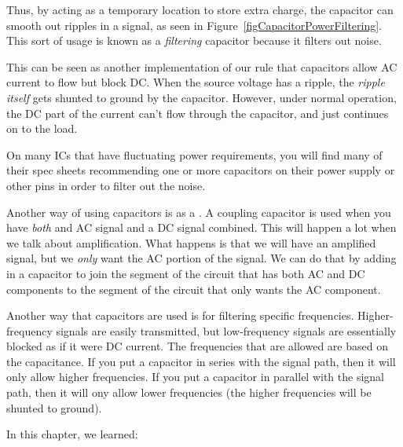 Thus, by acting as a temporary location to store extra charge, the capacitor can smooth out ripples in a signal, as seen in Figure~\ref{figCapacitorPowerFiltering}.
This sort of usage is known as a \emph{filtering} capacitor because it filters out noise.


This can be seen as another implementation of our rule that capacitors allow AC current to flow but block DC.
When the source voltage has a ripple, the \emph{ripple itself} gets shunted to ground by the capacitor.
However, under normal operation, the DC part of the current can't flow through the capacitor, and just continues on to the load.

On many ICs that have fluctuating power requirements, you will find many of their spec sheets recommending one or more capacitors on their power supply or other pins in order to filter out the noise.

Another way of using capacitors is as a .
A coupling capacitor is used when you have \emph{both} and AC signal and a DC signal combined.
This will happen a lot when we talk about amplification.
What happens is that we will have an amplified signal, but we \emph{only} want the AC portion of the signal.
We can do that by adding in a capacitor to join the segment of the circuit that has both AC and DC components to the segment of the circuit that only wants the AC component.

Another way that capacitors are used is for filtering specific frequencies.
Higher-frequency signals are easily transmitted, but low-frequency signals are essentially blocked as if it were DC current.
The frequencies that are allowed are based on the capacitance.
If you put a capacitor in series with the signal path, then it will only allow higher frequencies.
If you put a capacitor in parallel with the signal path, then it will ony allow lower frequencies (the higher frequencies will be shunted to ground).


\reviewsection

In this chapter, we learned:

